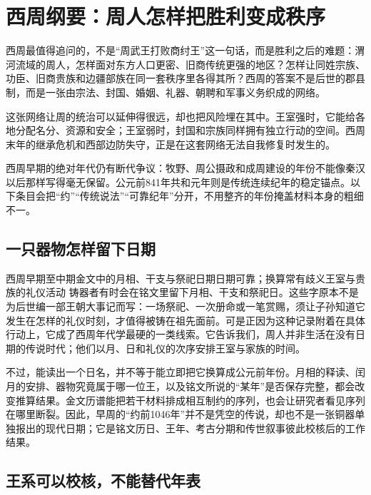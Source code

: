 \section{西周纲要：周人怎样把胜利变成秩序}

西周最值得追问的，不是“周武王打败商纣王”这一句话，而是胜利之后的难题：渭河流域的周人，怎样面对东方人口更密、旧商传统更强的地区？怎样让同姓宗族、功臣、旧商贵族和边疆部族在同一套秩序里各得其所？西周的答案不是后世的郡县制，而是一张由宗法、封国、婚姻、礼器、朝聘和军事义务织成的网络。

这张网络让周的统治可以延伸得很远，却也把风险埋在其中。王室强时，它能给各地分配名分、资源和安全；王室弱时，封国和宗族同样拥有独立行动的空间。西周末年的继承危机和西部边防失守，正是在这套网络无法自我修复时发生的。



\begin{sourcenote}[这条时间线有多可靠]
西周早期的绝对年代仍有断代争议：牧野、周公摄政和成周建设的年份不能像秦汉以后那样写得毫无保留。公元前841年共和元年则是传统连续纪年的稳定锚点。以下条目会把“约”“传统说法”“可靠纪年”分开，不用整齐的年份掩盖材料本身的粗细不一。
\end{sourcenote}

\subsection{一只器物怎样留下日期}

\begin{event}{西周早期至中期}{金文中的月相、干支与祭祀日期}{日期可靠；换算常有歧义}{王室与贵族的礼仪活动}
铸器者有时会在铭文里留下月相、干支和祭祀日。这些字原本不是为后世编一部王朝大事记而写：一场祭祀、一次册命或一笔赏赐，须让子孙知道它发生在怎样的礼仪时刻，才值得被铸在祖先面前。可是正因为这种记录附着在具体行动上，它成了西周年代学最硬的一类线索。它告诉我们，周人并非生活在没有日期的传说时代；他们以月、日和礼仪的次序安排王室与家族的时间。

不过，能读出一个日名，并不等于能立即把它换算成公元前年份。月相的释读、闰月的安排、器物究竟属于哪一位王，以及铭文所说的“某年”是否保存完整，都会改变推算结果。金文历谱能把若干材料排成相互制约的序列，也会让研究者看见序列在哪里断裂。因此，早周的“约前1046年”并不是凭空的传说，却也不是一张铜器单独报出的现代日期；它是铭文历日、王年、考古分期和传世叙事彼此校核后的工作结果。
\end{event}

\subsection{王系可以校核，不能替代年表}

